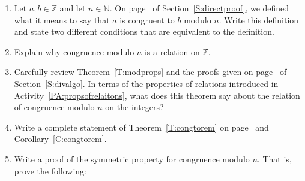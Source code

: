 \begin{previewactivity}\label{PA:reviewofcongruence} \hfill
\begin{enumerate}
\item Let  $a, b \in \mathbb{Z}$ and let  $n \in \mathbb{N}$.  On page~\pageref{congruence} of Section~\ref{S:directproof}, we defined what it means to say that  $a$  is congruent to  $b$  modulo  $n$.  Write this definition and state two different conditions that are equivalent to the definition.

\item %
Explain why congruence modulo  $n$  is a relation on  $\mathbb{Z}$.

\item Carefully review Theorem~\ref{T:modprops} and the proofs given on page~\pageref{T:modprops} of Section~\ref{S:divalgo}.  In terms of the properties of relations introduced in \typeu Activity~\ref*{PA:propsofrelaitons}, what does this theorem say about the relation of congruence modulo  $n$  on the integers?

\item Write a complete statement of Theorem~\ref{T:congtorem} on page~\pageref{T:congtorem} and Corollary~\ref{C:congtorem}.

\item Write a proof of the symmetric property for congruence modulo  $n$.  That is, prove the following:


\end{enumerate}
\end{previewactivity}
\hbreak





\endinput
